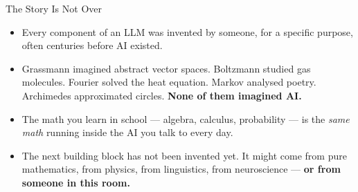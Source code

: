 \begin{frame}[shrink=25]{The Story Is Not Over}

  \begin{tcolorbox}[colback=aiViolet!8,colframe=aiViolet,
    fonttitle=\bfseries\Large,
    title={\raisebox{-0.2em}{\faInfinity}\ 2,000+ Years of Mathematics.
    One Machine. Your Turn.},
    rounded corners,boxrule=1.5pt,
    left=6pt,right=6pt,top=6pt,bottom=6pt]

    \begin{itemize}\setlength\itemsep{6pt}
      \item Every component of an LLM was invented by someone, for a
            specific purpose, often centuries before AI existed.

      \item Grassmann imagined abstract vector spaces. Boltzmann studied
            gas molecules. Fourier solved the heat equation. Markov
            analysed poetry. Archimedes approximated circles.
            \textbf{None of them imagined AI.}

      \item The math you learn in school --- algebra, calculus,
            probability --- is the \emph{same math} running inside the
            AI you talk to every day.

      \item The next building block has not been invented yet.
            It might come from pure mathematics, from physics, from
            linguistics, from neuroscience ---
            \textbf{or from someone in this room.}
    \end{itemize}
  \end{tcolorbox}


\end{frame}
